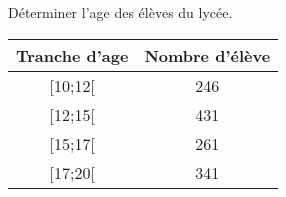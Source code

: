 
Déterminer l'age des élèves du lycée.

\begin{tabular}{|c|c|}
\hline 
Tranche d'age & Nombre d'élève  \\ 
\hline 
[10;12[ & 246 \\ 
\hline 
[12;15[ & 431  \\ 
\hline 
[15;17[ & 261  \\ 
\hline 
[17;20[ & 341  \\ 
\hline  
\end{tabular} 